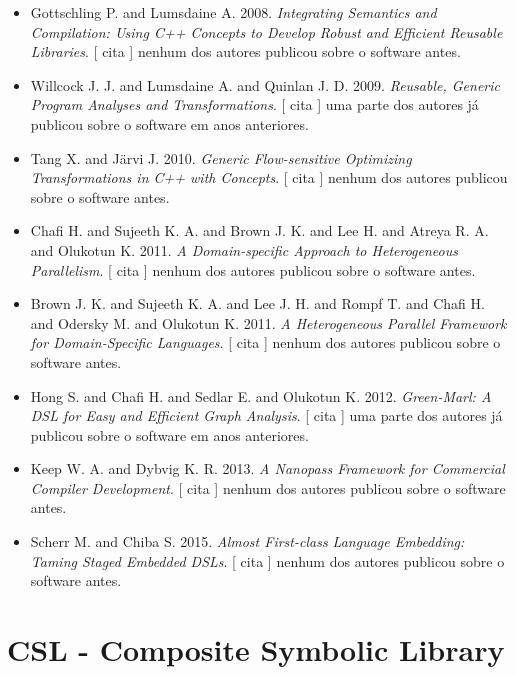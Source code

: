 \begin{itemize}
      [
          cita
      ]
uma parte dos autores já publicou sobre o software em anos anteriores.
\item Gottschling P. and Lumsdaine A.
      2008.
        \textit{ Integrating Semantics and Compilation: Using C++ Concepts to Develop Robust and Efficient Reusable Libraries}.
      [
          cita
      ]
nenhum dos autores publicou sobre o software antes.
\item Willcock J. J. and Lumsdaine A. and Quinlan J. D.
      2009.
        \textit{ Reusable, Generic Program Analyses and Transformations}.
      [
          cita
      ]
uma parte dos autores já publicou sobre o software em anos anteriores.
\item Tang X. and J\"{a}rvi J.
      2010.
        \textit{ Generic Flow-sensitive Optimizing Transformations in C++ with Concepts}.
      [
          cita
      ]
nenhum dos autores publicou sobre o software antes.
\item Chafi H. and Sujeeth K. A. and Brown J. K. and Lee H. and Atreya R. A. and Olukotun K.
      2011.
        \textit{ A Domain-specific Approach to Heterogeneous Parallelism}.
      [
          cita
      ]
nenhum dos autores publicou sobre o software antes.
\item Brown J. K. and Sujeeth K. A. and Lee J. H. and Rompf T. and Chafi H. and Odersky M. and Olukotun K.
      2011.
        \textit{ A Heterogeneous Parallel Framework for Domain-Specific Languages}.
      [
          cita
      ]
nenhum dos autores publicou sobre o software antes.
\item Hong S. and Chafi H. and Sedlar E. and Olukotun K.
      2012.
        \textit{ Green-Marl: A DSL for Easy and Efficient Graph Analysis}.
      [
          cita
      ]
uma parte dos autores já publicou sobre o software em anos anteriores.
\item Keep W. A. and Dybvig K. R.
      2013.
        \textit{ A Nanopass Framework for Commercial Compiler Development}.
      [
          cita
      ]
nenhum dos autores publicou sobre o software antes.
\item Scherr M. and Chiba S.
      2015.
        \textit{ Almost First-class Language Embedding: Taming Staged Embedded DSLs}.
      [
          cita
      ]
nenhum dos autores publicou sobre o software antes.
\end{itemize}
\section{CSL - Composite Symbolic Library}

